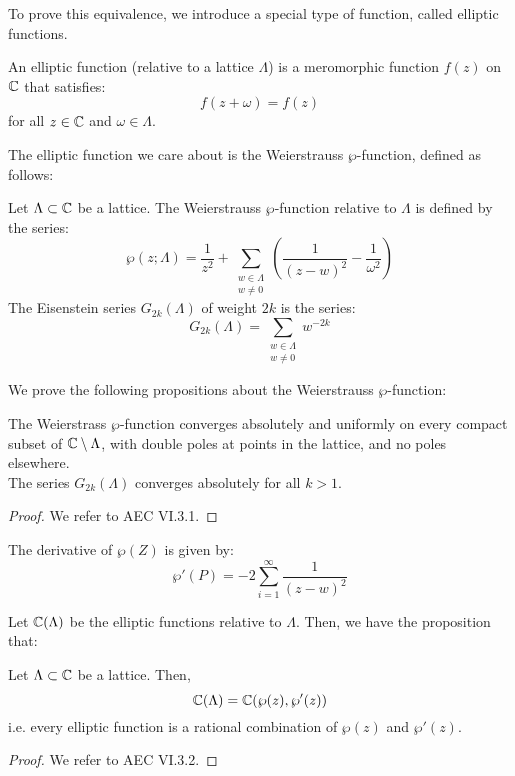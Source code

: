 \documentclass[12pt]{article}
\begin{document}
To prove this equivalence, we introduce a special type of function, called elliptic functions.

\begin{definition}
    An elliptic function (relative to a lattice $\Lambda$) is a meromorphic function $f(z)$ on $\mathbb C$ that satisfies: 
    \[ f(z+\omega) = f(z) \]
    for all $z \in \mathbb C$ and $\omega \in \Lambda$.
\end{definition}

The elliptic function we care about is the Weierstrauss $\wp$-function, defined as follows:

\begin{definition}
    Let $\Lambda \subset \mathbb C$ be a lattice. The Weierstrauss $\wp$-function relative to $\Lambda$ is defined by the series: 
    \[ \wp(z; \Lambda) = \frac{1}{z^2} + \sum_{\substack{w \in \Lambda \\ w \ne 0}} \left( \frac{1}{(z-w)^2} - \frac{1}{\omega^2}\right)\]
    The Eisenstein series $G_{2k}(\Lambda)$ of weight $2k$ is the series:
    \[ G_{2k}(\Lambda) = \sum_{\substack{w \in \Lambda \\ w \ne 0} }w^{-2k}\]
\end{definition}

We prove the following propositions about the Weierstrauss $\wp$-function:

\begin{prop}
    The Weierstrass $\wp$-function converges absolutely and uniformly on every compact subset of $\mathbb C\setminus \Lambda$, with double poles at points in the lattice, and no poles elsewhere. \\
    The series $G_{2k}(\Lambda)$ converges absolutely for all $k > 1$.
\end{prop}
\begin{proof}
    We refer to AEC VI.3.1. 
\end{proof}

The derivative of $\wp(Z)$ is given by:
\[\wp'(P) = -2\sum_{i=1}^\infty \frac{1}{(z-w)^2}\]

Let $\mathbb C(\Lambda)$ be the elliptic functions relative to $\Lambda$. Then, we have the proposition that:
\begin{prop}\label{:allWeier}
    Let $\Lambda \subset \mathbb C$ be a lattice. Then, 
    \[ \mathbb C(\Lambda) = \mathbb C(\wp(z), \wp'(z))\]
    i.e. every elliptic function is a rational combination of $\wp(z)$ and $\wp'(z)$.
\end{prop}
\begin{proof}
    We refer to AEC VI.3.2.
\end{proof}
\end{document}
